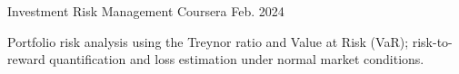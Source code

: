 \begin{cventries}
  \cventry
    {Investment Risk Management} %
    {Coursera} %
    {} %
    {Feb. 2024} %
    {
      \begin{cvitems}
        \item {Portfolio risk analysis using the Treynor ratio and Value at Risk (VaR); risk-to-reward quantification and loss estimation under normal market conditions.}
      \end{cvitems}
    }

\end{cventries}
